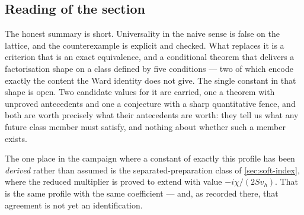 
\subsection{Reading of the section}

The honest summary is short. Universality in the naive sense is false on the
lattice, and the counterexample is explicit and checked. What replaces it is a
criterion that is an exact equivalence, and a conditional theorem that
delivers a factorisation shape on a class defined by five conditions --- two of
which encode exactly the content the Ward identity does not give. The single
constant in that shape is open. Two candidate values for it are carried, one a
theorem with unproved antecedents and one a conjecture with a sharp
quantitative fence, and both are worth precisely what their antecedents are
worth: they tell us what any future class member must satisfy, and nothing
about whether such a member exists.

The one place in the campaign where a constant of exactly this profile has
been \emph{derived} rather than assumed is the separated-preparation class of
\cref{sec:soft-index}, where the reduced multiplier is proved to extend with
value $-i\chi/(2Sv_h)$. That is the same profile with the same coefficient ---
and, as recorded there, that agreement is not yet an identification.
